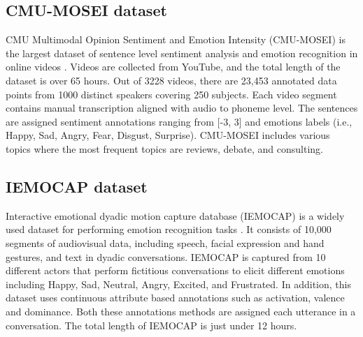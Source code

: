 \subsection{CMU-MOSEI dataset}
CMU Multimodal Opinion Sentiment and Emotion Intensity (CMU-MOSEI) is the largest dataset of sentence level sentiment analysis and emotion recognition in online videos \cite{MSA_review2_GANDHI2023424} \cite{cmu-mosei_zadeh2018multimodal} \cite{HP_Advanced}. Videos are collected from YouTube, and the total length of the dataset is over 65 hours. Out of 3228 videos, there are 23,453 annotated data points from 1000 distinct speakers covering 250 subjects. Each video segment contains manual transcription aligned with audio to phoneme level. The sentences are assigned sentiment annotations ranging from [-3, 3] and emotions labels (i.e., Happy, Sad, Angry, Fear, Disgust, Surprise). CMU-MOSEI includes various topics where the most frequent topics are reviews, debate, and consulting. 

\subsection{IEMOCAP dataset}
Interactive emotional dyadic motion capture database (IEMOCAP) is a widely used dataset for performing emotion recognition tasks \cite{iemocap_dataset} \cite{HP_Advanced}. It consists of 10,000 segments of audiovisual data, including speech, facial expression and hand gestures, and text in dyadic conversations. IEMOCAP is captured from 10 different actors that perform fictitious conversations to elicit different emotions including Happy, Sad, Neutral, Angry, Excited, and Frustrated. In addition, this dataset uses continuous attribute based annotations such as activation, valence and dominance. Both these annotations methods are assigned each utterance in a conversation. The total length of IEMOCAP is just under 12 hours. \\

